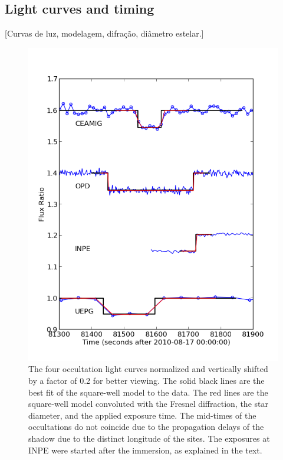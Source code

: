 \documentclass[useAMS,usenatbib]{mn2e}
\begin{document}
\subsection{Light curves and timing}

[Curvas de luz, modelagem, difraç\~ao, di\^ametro estelar.]


\begin{figure}
\includegraphics[scale=0.58]{figures/Ceres_2010_fluxratio.png} 
\caption{The four occultation light curves normalized and vertically shifted by a factor of 0.2 for better viewing. The solid black lines are the best fit of the square-well model to the data. The red lines are the square-well model convoluted with the Fresnel diffraction, the star diameter, and the applied exposure time. The mid-times of the occultations do not coincide due to the propagation delays of the shadow due to the distinct longitude of the sites. The exposures at INPE were started after the immersion, as explained in the text. \label{Fig: Ceres-2010-curves}}
\end{figure}
\end{document}
